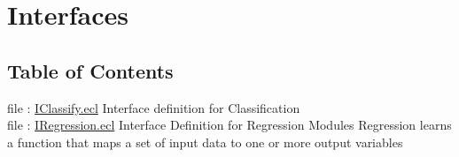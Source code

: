 \chapter*{Interfaces}
\hypertarget{ecldoc:toc:ML_Core/Interfaces}{}


\section*{Table of Contents}
file : \hyperlink{ecldoc:toc:ML_Core.Interfaces.IClassify}{IClassify.ecl}  Interface definition for Classification \\
file : \hyperlink{ecldoc:toc:ML_Core.Interfaces.IRegression}{IRegression.ecl}  Interface Definition for Regression Modules Regression learns a function that maps a set of input data to one or more output variables \\



